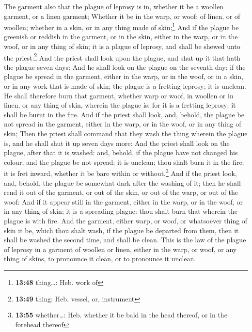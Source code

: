  The garment also that the plague of leprosy is in,
whether it be a woollen garment, or a linen garment; 
Whether it be in the warp, or woof; of linen, or of woollen; whether in
a skin, or in any thing made of skin;\footnote{\textbf{13:48}
  thing\ldots: Heb. work of}  And if the plague be
greenish or reddish in the garment, or in the skin, either in the warp,
or in the woof, or in any thing of skin; it is a plague of leprosy, and
shall be shewed unto the priest:\footnote{\textbf{13:49} thing: Heb.
  vessel, or, instrument}  And the priest shall look upon
the plague, and shut up it that hath the plague seven days:
 And he shall look on the plague on the seventh day: if
the plague be spread in the garment, either in the warp, or in the woof,
or in a skin, or in any work that is made of skin; the plague is a
fretting leprosy; it is unclean.  He shall therefore burn
that garment, whether warp or woof, in woollen or in linen, or any thing
of skin, wherein the plague is: for it is a fretting leprosy; it shall
be burnt in the fire.  And if the priest shall look, and,
behold, the plague be not spread in the garment, either in the warp, or
in the woof, or in any thing of skin;  Then the priest
shall command that they wash the thing wherein the plague is, and he
shall shut it up seven days more:  And the priest shall
look on the plague, after that it is washed: and, behold, if the plague
have not changed his colour, and the plague be not spread; it is
unclean; thou shalt burn it in the fire; it is fret inward, whether it
be bare within or without.\footnote{\textbf{13:55} whether\ldots: Heb.
  whether it be bald in the head thereof, or in the forehead thereof}
 And if the priest look, and, behold, the plague be
somewhat dark after the washing of it; then he shall rend it out of the
garment, or out of the skin, or out of the warp, or out of the woof:
 And if it appear still in the garment, either in the
warp, or in the woof, or in any thing of skin; it is a spreading plague:
thou shalt burn that wherein the plague is with fire. 
And the garment, either warp, or woof, or whatsoever thing of skin it
be, which thou shalt wash, if the plague be departed from them, then it
shall be washed the second time, and shall be clean. 
This is the law of the plague of leprosy in a garment of woollen or
linen, either in the warp, or woof, or any thing of skins, to pronounce
it clean, or to pronounce it unclean.

